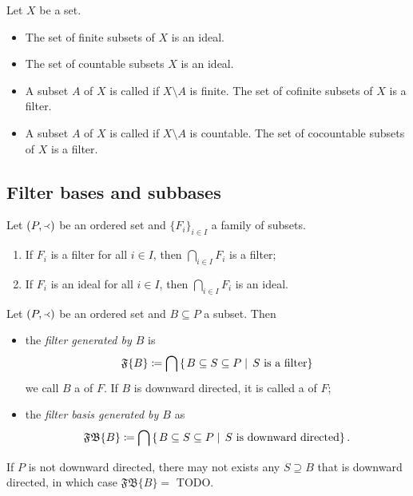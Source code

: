 \begin{example}
Let $X$ be a set.
\begin{itemize}
\item The set of finite subsets of $X$ is an ideal.
\item The set of countable subsets $X$ is an ideal.
\item A subset $A$ of $X$ is called  if $X\setminus A$ is finite. The set of cofinite subsets of $X$ is a filter.
\item A subset $A$ of $X$ is called  if $X\setminus A$ is countable. The set of cocountable subsets of $X$ is a filter.
\end{itemize}
\end{example}

\subsection{Filter bases and subbases}

\begin{lemma}
Let $\left( P,\Yleft \right)$ be an ordered set and $\{F_i\}_{i\in I}$ a family of subsets.
\begin{enumerate}
\item If $F_i$ is a filter for all $i\in I$, then $\bigcap_{i\in I}F_i$ is a filter;
\item If $F_i$ is an ideal for all $i\in I$, then $\bigcap_{i\in I}F_i$ is an ideal.
\end{enumerate}
\end{lemma}

\begin{definition}
Let $\left( P,\Yleft \right)$ be an ordered set and $B\subseteq P$ a subset. Then
\begin{itemize}
\item the \emph{filter generated by $B$} is
\[ \mathfrak{F}\{B\} \coloneqq \bigcap\left\{\left. B \subseteq S\subseteq P \;\right|\; \text{$S$ is a filter} \right\} \]
we call $B$ a  of $F$. If $B$ is downward directed, it is called a  of $F$;
\item the \emph{filter basis generated by $B$} as
\[ \mathfrak{FB}\{B\} \coloneqq \bigcap\left\{\left. B \subseteq S\subseteq P \;\right|\; \text{$S$ is downward directed} \right\}. \]
\end{itemize}
\end{definition}

If $P$ is not downward directed, there may not exists any $S \supseteq B$ that is downward directed, in which case $\mathfrak{FB}\{B\} =$ TODO.

